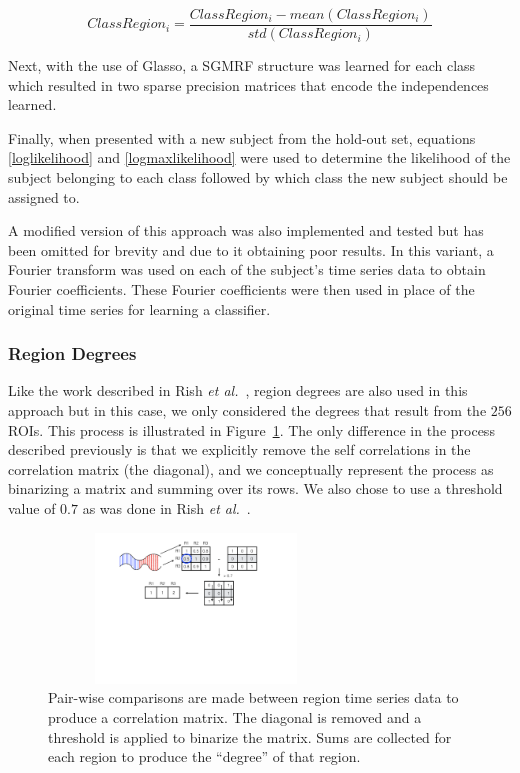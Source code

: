 \documentclass{article} %
\begin{document}
\begin{equation}
ClassRegion_i = \frac{ClassRegion_i - mean(ClassRegion_i)}{std(ClassRegion_i)}
\end{equation}

Next, with the use of Glasso, a SGMRF structure was learned for each class 
which resulted in two sparse precision matrices that encode the independences
learned. 

Finally, when presented with a new subject from the hold-out set, equations
\eqref{loglikelihood} and \eqref{logmaxlikelihood} were used to determine the 
likelihood of the subject belonging to each class followed by which class
the new subject should be assigned to.

A modified version of this approach was also implemented and tested but has
been omitted for brevity and due to it obtaining poor results. In this variant,
a Fourier transform was used on each of the subject's time series data to 
obtain Fourier coefficients. These Fourier coefficients were then used in 
place of the original time series for learning a classifier.


\subsubsection{Region Degrees}

Like the work described in Rish \emph{et al.}~\cite{rish2009discriminative}, 
region degrees are also used in this approach but in this case, we only 
considered the degrees that result from the $256$ ROIs. This process is 
illustrated in Figure~\ref{fig:degree_calc}. The only difference in the
process described previously is that we explicitly remove the self 
correlations in the correlation matrix (the diagonal), and we conceptually
represent the process as binarizing a matrix and summing over its rows.
We also chose to use a threshold value of $0.7$ as was done in Rish 
\emph{et al.}~\cite{rish2009discriminative}.

\begin{figure}[!htb]
  \centering
  \includegraphics[width=0.7\textwidth, height=4.0cm]{diagrams/ROI_deg_img.pdf}
  \caption{Pair-wise comparisons are made between region time series data to
  produce a correlation matrix. The diagonal is removed and a threshold is
  applied to binarize the matrix. Sums are collected for each region to
  produce the ``degree'' of that region.}
  \label{fig:degree_calc}
\end{figure}
\end{document}
